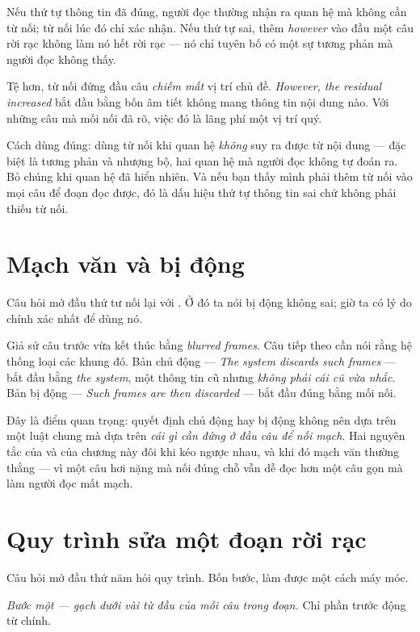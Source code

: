 \documentclass[../../english.tex]{subfiles}
\begin{document}
Nếu thứ tự thông tin đã đúng, người đọc thường nhận ra quan hệ mà không cần từ nối\cite{halliday1976}; từ nối lúc đó chỉ xác nhận. Nếu thứ tự sai, thêm \emph{however} vào đầu một câu rời rạc không làm nó hết rời rạc --- nó chỉ tuyên bố có một sự tương phản mà người đọc không thấy.

Tệ hơn, từ nối đứng đầu câu \emph{chiếm mất} vị trí chủ đề. \emph{However, the residual increased} bắt đầu bằng bốn âm tiết không mang thông tin nội dung nào. Với những câu mà mối nối đã rõ, việc đó là lãng phí một vị trí quý.

Cách dùng đúng: dùng từ nối khi quan hệ \emph{không} suy ra được từ nội dung --- đặc biệt là tương phản và nhượng bộ, hai quan hệ mà người đọc không tự đoán ra. Bỏ chúng khi quan hệ đã hiển nhiên. Và nếu bạn thấy mình phải thêm từ nối vào mọi câu để đoạn đọc được, đó là dấu hiệu thứ tự thông tin sai chứ không phải thiếu từ nối.

\section{Mạch văn và bị động}

Câu hỏi mở đầu thứ tư nối lại với . Ở đó ta nói bị động không sai; giờ ta có lý do chính xác nhất để dùng nó.

Giả sử câu trước vừa kết thúc bằng \emph{blurred frames}. Câu tiếp theo cần nói rằng hệ thống loại các khung đó. Bản chủ động --- \emph{The system discards such frames} --- bắt đầu bằng \emph{the system}, một thông tin cũ nhưng \emph{không phải cái cũ vừa nhắc}. Bản bị động --- \emph{Such frames are then discarded} --- bắt đầu đúng bằng mối nối.

Đây là điểm quan trọng: quyết định chủ động hay bị động không nên dựa trên một luật chung mà dựa trên \emph{cái gì cần đứng ở đầu câu để nối mạch}. Hai nguyên tắc của  và của chương này đôi khi kéo ngược nhau, và khi đó mạch văn thường thắng --- vì một câu hơi nặng mà nối đúng chỗ vẫn dễ đọc hơn một câu gọn mà làm người đọc mất mạch.

\section{Quy trình sửa một đoạn rời rạc}

Câu hỏi mở đầu thứ năm hỏi quy trình. Bốn bước, làm được một cách máy móc.

\emph{Bước một --- gạch dưới vài từ đầu của mỗi câu trong đoạn.} Chỉ phần trước động từ chính.
\end{document}
